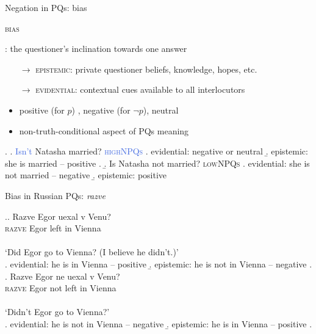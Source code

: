 \documentclass[xcolor=dvipsnames]{beamer}
\begin{document}
\begin{frame}{Negation in PQs: bias}
    \begin{large}\textsc{bias}\end{large}: the questioner's inclination towards one answer \\
    \begin{scriptsize}
        \cite{buring-gunlogson00, Sudo2013, Gaertner2017} 
    \end{scriptsize}
    \begin{itemize}
        \item[$\rightarrow$] \textsc{epistemic}: private questioner beliefs, knowledge, hopes, etc.
        \item[$\rightarrow$] \textsc{evidential}: contextual cues available to all interlocutors 
    \end{itemize}
    \pause 
    \begin{itemize}
        \item positive (for $p$) , negative (for $\neg p$), neutral 
        \item non-truth-conditional aspect of PQs meaning
    \end{itemize} 
    \pause
    \begin{small}
        \ex. \a. \textcolor{RoyalBlue}{Isn't} Natasha married? \hfill \textcolor{RoyalBlue}{\textsc{highNPQs}}
            \a. evidential: negative or neutral
            \b. epistemic: she is married -- positive
            \z. 
            \vspace{.5em}
        \b. Is Natasha \textcolor{WildStrawberry}{not} married? \hfill \textcolor{WildStrawberry}{\textsc{lowNPQs}}
            \a. evidential: she is not married -- negative
            \b. epistemic: positive
        \par 
    \end{small}
  
\end{frame}

\begin{frame}{Bias in Russian PQs: \textit{razve}}
    \begin{scriptsize}
        \cite{Repptoappear, Korotkovatoappear}
    \end{scriptsize}
    \ex.\ag. Razve Egor uexal v Venu?  \\
    \textsc{razve} Egor left in Vienna \\\\
    `Did Egor go to Vienna? (I believe he didn't.)' \\  
    \a. evidential: he is in Vienna -- positive
    \b. epistemic: he is not in Vienna -- negative  
    \z. 
    \vspace{0.5em}
    \pause
    \bg. Razve Egor ne uexal v Venu?  \\
    \textsc{razve} Egor not left in Vienna \\\\
    `Didn't Egor go to Vienna?' \\  
    \a. evidential: he is not in Vienna -- negative
    \b. epistemic: he is in Vienna -- positive  
    \z. 
    \par

\end{frame}
\end{document}
